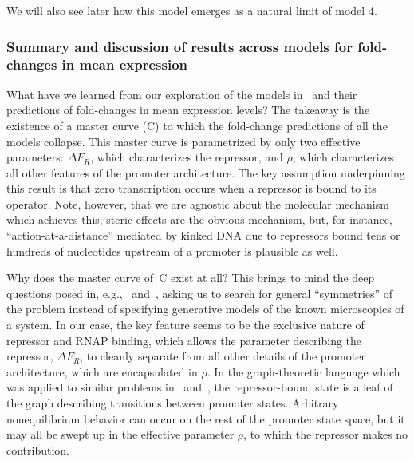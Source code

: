 We will also see later how this model emerges as a natural limit of model 4.

\subsubsection{Summary and discussion of results across models for fold-changes in mean expression}
What have we learned from our exploration of the models
in~ and their predictions of fold-changes in mean
expression levels? The takeaway is the existence of a master curve
(C) to which the fold-change predictions of all the
models collapse. This master curve is parametrized by only two effective
parameters: $\Delta F_R$, which characterizes the repressor, and $\rho$, which
characterizes all other features of the promoter architecture. The key
assumption underpinning this result is that zero transcription occurs when a
repressor is bound to its operator. Note, however, that we are agnostic about
the molecular mechanism which achieves this; steric effects are the obvious
mechanism, but, for instance, ``action-at-a-distance'' mediated by kinked DNA
due to repressors bound tens or hundreds of nucleotides upstream of a promoter
is plausible as well.

Why does the master curve of~C exist at all? This
brings to mind the deep questions posed in, e.g.,~\cite{Frank2013}
and~\cite{Frank2014a}, asking us to search for general ``symmetries'' of the
problem instead of specifying generative models of the known microscopics of a
system. In our case, the key feature seems to be the exclusive nature of
repressor and RNAP binding, which allows the parameter describing the repressor,
$\Delta F_R$, to cleanly separate from all other details of the promoter
architecture, which are encapsulated in $\rho$. In the graph-theoretic language
which was applied to similar problems in~\cite{Gunawardena2012}
and~\cite{Ahsendorf2014}, the repressor-bound state is a leaf of the graph
describing transitions between promoter states. Arbitrary nonequilibrium
behavior can occur on the rest of the promoter state space, but it may all be
swept up in the effective parameter $\rho$, to which the repressor makes no
contribution.

